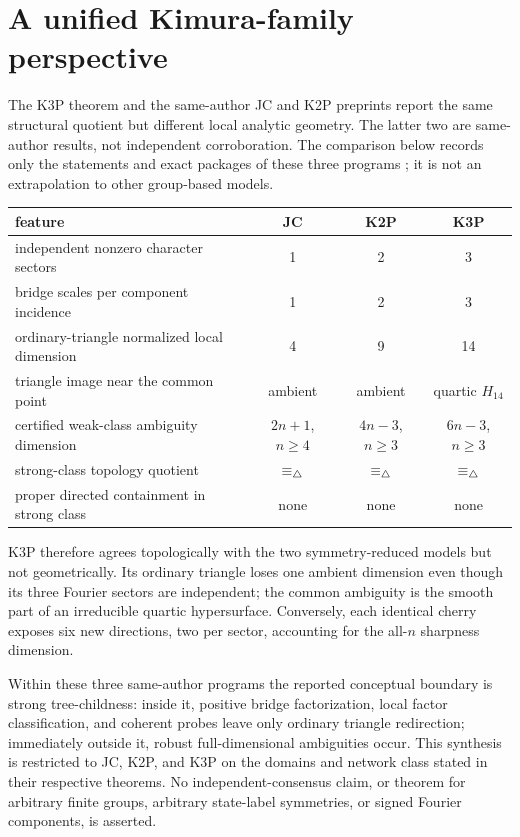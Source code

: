 \section{A unified Kimura-family perspective}\label{sec:kimura-perspective}

The K3P theorem and the same-author JC and K2P preprints report the same
structural quotient but different local analytic geometry.  The latter two
are same-author results, not independent corroboration.  The
comparison below records only the statements and exact packages of these
three programs \cite{KriebelJC2026,KriebelK2P2026}; it is not an extrapolation
to other group-based models.

\begin{center}
\small
\begin{tabular}{L{.29\linewidth}ccc}
\toprule
feature & JC & K2P & K3P\\
\midrule
independent nonzero character sectors & 1 & 2 & 3\\
bridge scales per component incidence & 1 & 2 & 3\\
ordinary-triangle normalized local dimension & 4 & 9 & 14\\
triangle image near the common point & ambient & ambient & quartic \(H_{14}\)\\
certified weak-class ambiguity dimension & \(2n+1\), \(n\ge4\) & \(4n-3\), \(n\ge3\) & \(6n-3\), \(n\ge3\)\\
strong-class topology quotient & \(\equiv_\triangle\) & \(\equiv_\triangle\) & \(\equiv_\triangle\)\\
proper directed containment in strong class & none & none & none\\
\bottomrule
\end{tabular}
\end{center}

K3P therefore agrees topologically with the two symmetry-reduced models but
not geometrically.  Its ordinary triangle loses one ambient dimension even
though its three Fourier sectors are independent; the common ambiguity is
the smooth part of an irreducible quartic hypersurface.  Conversely, each
identical cherry exposes six new directions, two per sector, accounting for
the all-\(n\) sharpness dimension.

Within these three same-author programs the reported conceptual boundary is
strong tree-childness: inside it, positive bridge factorization, local factor
classification, and coherent probes leave only ordinary triangle redirection;
immediately outside it, robust full-dimensional ambiguities occur.  This
synthesis is restricted to JC, K2P, and K3P on the domains and network class
stated in their respective theorems.  No independent-consensus claim, or
theorem for arbitrary finite groups, arbitrary state-label symmetries, or
signed Fourier components, is asserted.
